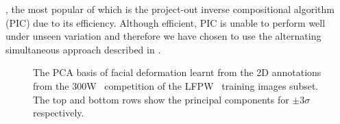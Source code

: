 \cite{gross2005generic,matthews2004active,papandreou2008adaptive}, the most popular of
which is the project-out inverse compositional algorithm (PIC)
\cite{cootes2001active,amberg2009compositional} due to its efficiency. Although efficient, PIC
is unable to perform well under unseen variation and therefore we have chosen to
use the alternating simultaneous approach described in \cite{matthews2004active}.
\setlength{\tabcolsep}{2pt}
\begin{figure}
    \centering
    \caption{The PCA basis of facial deformation learnt from the
             2D annotations from the 300W~\cite{sagonas2013300} competition
             of the LFPW~\cite{belhumeur2013localizing} training images subset.
             The top and bottom rows show the principal components for
             $\pm 3 \sigma$ respectively.}
\label{fig:singl_img_aam_shape_model}
\end{figure}
\setlength{\tabcolsep}{6pt}
